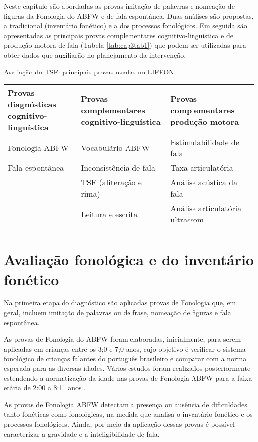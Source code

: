 \documentclass[output=paper,colorlinks,citecolor=brown,booklanguage=portuguese]{langscibook}
\begin{document}
Neste capítulo são abordadas as provas imitação de palavras e nomeação de figuras da Fonologia do ABFW e de fala espontânea. Duas análises são propostas, a tradicional (inventário fonético) e a dos processos fonológicos. Em seguida são apresentadas as principais provas complementares cognitivo-linguística e de produção motora de fala (Tabela \ref{tab:cap3tab1}) que podem ser utilizadas para obter dados que auxiliarão no planejamento da intervenção.




\begin{Tabela}
\caption{Avaliação do TSF: principais provas usadas no LIFFON}
\label{tab:cap3tab1}


\begin{tabularx}{\textwidth}{QQQ}
\lsptoprule
\textbf{Provas diagnósticas -- cognitivo-linguística} & \textbf{Provas complementares -- cognitivo-linguística} & \textbf{Provas complementares -- produção motora}\\
\midrule
Fonologia ABFW & Vocabulário ABFW & Estimulabilidade de fala\\
\tablevspace
Fala espontânea & Inconsistência de fala & Taxa articulatória\\
\tablevspace
& TSF (aliteração e rima) & Análise acústica da fala\\
\tablevspace
& Leitura e escrita & Análise articulatória -- ultrassom\\
\lspbottomrule
\end{tabularx}
\end{Tabela}


\section{Avaliação fonológica e do inventário fonético}
Na primeira etapa do diagnóstico são aplicadas provas de Fonologia que, em geral, incluem imitação de palavras ou de frase, nomeação de figuras e fala espontânea.

As provas de Fonologia do ABFW foram elaboradas, inicialmente, para serem aplicadas em crianças entre os 3;0 e 7;0 anos, cujo objetivo é verificar o sistema fonológico de crianças falantes do português brasileiro e comparar com a norma esperada para as diversas idades. Vários estudos foram realizados posteriormente estendendo a normatização da idade nas provas de Fonologia ABFW para a faixa etária de 2:00 a 8:11 anos \citep{Galea2003, Galea2008, Wertzner2004a, Wertzner2004b}.

As provas de Fonologia ABFW detectam a presença ou ausência de dificuldades tanto fonéticas como fonológicas, na medida que analisa o inventário fonético e os processos fonológicos. Ainda, por meio da aplicação dessas provas é possível caracterizar a gravidade e a inteligibilidade de fala. 
\end{document}
